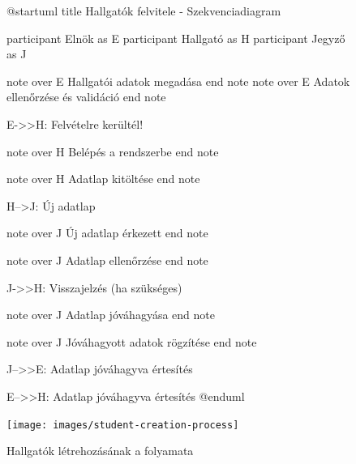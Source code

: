 \documentclass[a4paper,12pt]{article}
\begin{document}
\begin{figure}
	\centering
	\begin{plantuml}
@startuml
title Hallgatók felvitele - Szekvenciadiagram

participant Elnök as E
participant Hallgató as H
participant Jegyző as J

note over E
Hallgatói adatok megadása
end note
note over E
Adatok ellenőrzése és validáció
end note

E->>H: Felvételre kerültél!

note over H 
Belépés a rendszerbe
end note

note over H 
Adatlap kitöltése
end note

H-->J: Új adatlap

note over J 
Új adatlap érkezett
end note

note over J 
Adatlap ellenőrzése
end note

J->>H: Visszajelzés (ha szükséges)

note over J 
Adatlap jóváhagyása
end note

note over J 
Jóváhagyott adatok rögzítése
end note

J-->>E: Adatlap jóváhagyva értesítés

E-->>H: Adatlap jóváhagyva értesítés
@enduml
	\end{plantuml}
	\texttt{[image: images/student-creation-process]}
	\caption{Hallgatók létrehozásának a folyamata}
	\label{fig:student-creation-process}
\end{figure}
\end{document}
